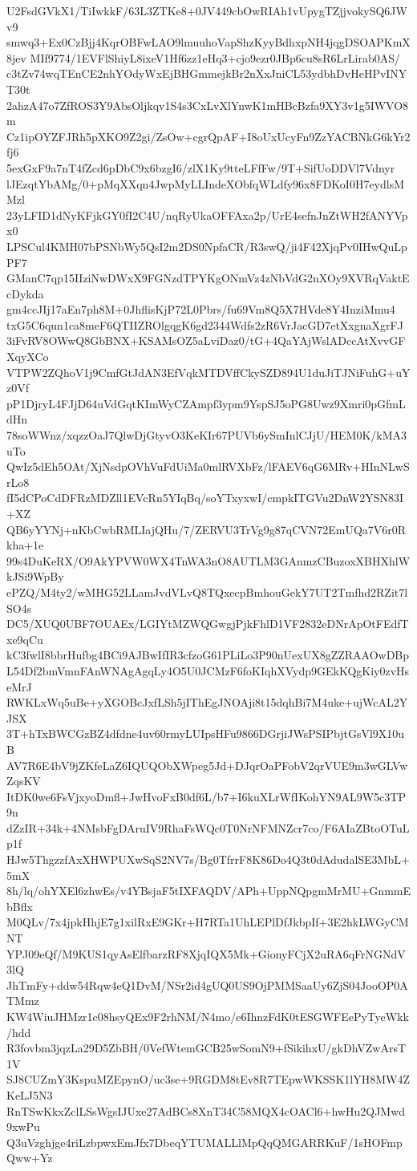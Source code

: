 U2FsdGVkX1/TiIwkkF/63L3ZTKe8+0JV449cbOwRIAh1vUpygTZjjvokySQ6JWv9
smwq3+Ex0CzBjj4KqrOBFwLAO9lmuuhoVapShzKyyBdhxpNH4jqgDSOAPKmX8jev
MIf9774/1EVFlShiyL8ixeV1Hf6zz1eHq3+cjo9ezr0JBp6cu8sR6LrLirab0AS/
c3tZv74wqTEnCE2nhYOdyWxEjBHGmmejkBr2nXxJniCL53ydbhDvHeHPvINYT30t
2ahzA47o7ZfROS3Y9AbsOljkqv1S4s3CxLvXlYnwK1mHBcBzfa9XY3v1g5IWVO8m
Cz1ipOYZFJRh5pXKO9Z2gi/ZsOw+cgrQpAF+I8oUxUcyFn9ZzYACBNkG6kYr2fj6
5exGxF9a7nT4fZcd6pDbC9x6bzgI6/zlX1Ky9tteLFfFw/9T+SifUoDDVl7Vdnyr
lJEzqtYbAMg/0+pMqXXqn4JwpMyLLIndeXObfqWLdfy96x8FDKoI0H7eydlsMMzl
23yLFID1dNyKFjkGY0fI2C4U/nqRyUkaOFFAxa2p/UrE4sefnJnZtWH2fANYVpx0
LPSCul4KMH07bPSNbWy5QsI2m2DS0NpfaCR/R3swQ/ji4F42XjqPv0IHwQuLpPF7
GManC7qp15IIziNwDWxX9FGNzdTPYKgONmVz4zNbVdG2nXOy9XVRqVaktEcDykda
gm4ccJIj17aEn7ph8M+0JhflisKjP72L0Pbrs/fu69Vm8Q5X7HVde8Y4InziMmu4
txG5C6qun1ca8meF6QTIIZROlgqgK6gd2344Wdfs2zR6VrJacGD7etXxgnaXgrFJ
3iFvRV8OWwQ8GbBNX+KSAMsOZ5aLviDaz0/tG+4QaYAjWslADccAtXvvGFXqyXCo
VTPW2ZQhoV1j9CmfGtJdAN3EfVqkMTDVffCkySZD894U1duJiTJNiFuhG+uYz0Vf
pP1DjryL4FJjD64uVdGqtKImWyCZAmpf3ypm9YspSJ5oPG8Uwz9Xmri0pGfmLdHn
78soWWnz/xqzzOaJ7QlwDjGtyvO3KeKIr67PUVb6ySmInlCJjU/HEM0K/kMA3uTo
QwIz5dEh5OAt/XjNsdpOVhVuFdUiMa0mlRVXbFz/lFAEV6qG6MRv+HInNLwSrLo8
fI5dCPoCdDFRzMDZll1EVcRn5YIqBq/soYTxyxwI/cmpkITGVu2DnW2YSN83I+XZ
QB6yYYNj+nKbCwbRMLIajQHu/7/ZERVU3TrVg9g87qCVN72EmUQa7V6r0Rkha+1e
99s4DuKeRX/O9AkYPVW0WX4TnWA3nO8AUTLM3GAnmzCBuzoxXBHXhlWkJSi9WpBy
ePZQ/M4ty2/wMHG52LLamJvdVLvQ8TQxecpBmhouGekY7UT2Tmfhd2RZit7lSO4s
DC5/XUQ0UBF7OUAEx/LGIYtMZWQGwgjPjkFhlD1VF2832eDNrApOtFEdfTxe9qCu
kC3fwlI8bbrHufbg4BCi9AJBwIfIR3cfzoG61PLiLo3P90nUexUX8gZZRAAOwDBp
L54Df2bmVmnFAnWNAgAgqLy4O5U0JCMzF6foKIqhXVydp9GEkKQgKiy0zvHseMrJ
RWKLxWq5uBe+yXGOBcJxfLSh5jIThEgJNOAji8t15dqhBi7M4uke+ujWcAL2YJSX
3T+hTxBWCGzBZ4dfdne4uv60rmyLUIpsHFu9866DGrjiJWsPSIPbjtGsVl9X10uB
AV7R6E4bV9jZKfeLaZ6IQUQObXWpeg5Jd+DJqrOaPFobV2qrVUE9m3wGLVwZqsKV
ItDK0we6FsVjxyoDmfl+JwHvoFxB0df6L/b7+I6kuXLrWfIKohYN9AL9W5c3TP9n
dZzIR+34k+4NMsbFgDAruIV9RhaFsWQc0T0NrNFMNZcr7co/F6AIaZBtoOTuLp1f
HJw5ThgzzfAxXHWPUXwSqS2NV7s/Bg0TfrrF8K86Do4Q3t0dAdudalSE3MbL+5mX
8h/lq/ohYXEl6zhwEs/v4YBsjaF5tIXFAQDV/APh+UppNQpgmMrMU+GnmmEbBflx
M0QLv/7x4jpkHhjE7g1xilRxE9GKr+H7RTa1UhLEPlDfJkbpIf+3E2hkLWGyCMNT
YPJ09eQf/M9KUS1qyAsElfbarzRF8XjqIQX5Mk+GionyFCjX2uRA6qFrNGNdV3lQ
JhTmFy+ddw54Rqw4eQ1DvM/NSr2id4gUQ0US9OjPMMSaaUy6ZjS04JooOP0ATMmz
KW4WiuJHMzr1c08hsyQEx9F2rhNM/N4mo/e6IhnzFdK0tESGWFEePyTyeWkk/hdd
R3fovbm3jqzLa29D5ZbBH/0VefWtemGCB25wSomN9+fSikihxU/gkDhVZwArsT1V
SJ8CUZmY3KspuMZEpynO/uc3se+9RGDM8tEv8R7TEpwWKSSK1lYH8MW4ZKeLJ5N3
RnTSwKkxZclLSsWgsIJUxe27AdBCs8XnT34C58MQX4cOACl6+hwHu2QJMwd9xwPu
Q3uVzghjge4riLzbpwxEmJfx7DbeqYTUMALLlMpQqQMGARRKuF/1sHOFmpQww+Yz

